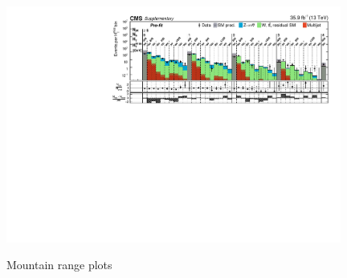 \begin{figure}
\begin{center}
{            \includegraphics[width=0.98\textwidth]{Supplementary/FullBinning_results_6+_jets_no-fit_aux}
            \label{fig:full_6jet_no-fit}} \\
        \caption{ Mountain range plots
        }
        \label{fig:T1qqqqLL}
    \end{center}
\end{figure}


